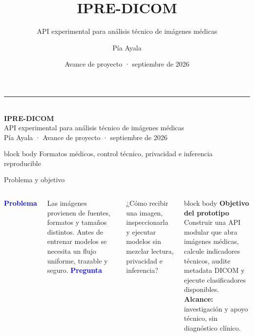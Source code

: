 \documentclass[aspectratio=169,10pt]{beamer}
\title{IPRE-DICOM}
\subtitle{API experimental para análisis técnico de imágenes médicas}
\author{Pía Ayala}
\date{Avance de proyecto · septiembre de 2026}
\newcommand{\bigpoint}[2]{\textcolor{Blue}{\Large\bfseries #1}\par\smallskip #2}
\begin{document}
\begin{frame}[plain]
  \vspace{1.2cm}
  {\color{Cyan}\rule{2.1cm}{3pt}}\\[0.35cm]
  {\fontsize{30}{34}\selectfont\bfseries\color{Navy} IPRE-DICOM}\\[0.25cm]
  {\Large API experimental para análisis técnico de imágenes médicas}\\[0.8cm]
  {\color{Muted}Pía Ayala · Avance de proyecto · septiembre de 2026}\\[1.0cm]
  \begin{beamercolorbox}[sep=0.35cm,wd=0.78\textwidth]{block body}
    \color{Ink}Formatos médicos, control técnico, privacidad e inferencia reproducible
  \end{beamercolorbox}
\end{frame}

\begin{frame}{Problema y objetivo}
\begin{columns}[T,onlytextwidth]
\bigpoint{Problema}{Las imágenes provienen de fuentes, formatos y tamaños distintos. Antes de entrenar modelos se necesita un flujo uniforme, trazable y seguro.}
\vspace{0.55cm}
\bigpoint{Pregunta}{¿Cómo recibir una imagen, inspeccionarla y ejecutar modelos sin mezclar lectura, privacidad e inferencia?}
\begin{beamercolorbox}[rounded=true,sep=0.45cm]{block body}
{\bfseries\color{Navy}Objetivo del prototipo}\\[0.25cm]
Construir una API modular que abra imágenes médicas, calcule indicadores técnicos, audite metadata DICOM y ejecute clasificadores disponibles.\\[0.35cm]
{\color{Coral}\bfseries Alcance:} investigación y apoyo técnico, sin diagnóstico clínico.
\end{beamercolorbox}
\end{columns}
\end{frame}
\end{document}
